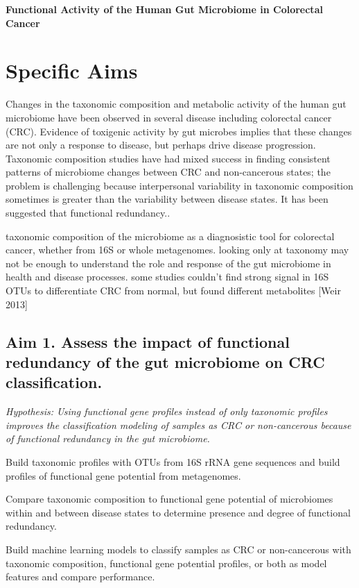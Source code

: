 \documentclass[12pt]{article}
\begin{document}
\sloppy
\begin{center}\large{\textbf{Functional Activity of the Human Gut Microbiome in Colorectal Cancer}}\end{center}
\section*{Specific Aims}

Changes in the taxonomic composition and metabolic activity of the human gut microbiome have been observed in several disease including colorectal cancer (CRC).
Evidence of toxigenic activity by gut microbes implies that these changes are not only a response to disease, but perhaps drive disease progression.
Taxonomic composition studies have had mixed success in finding consistent patterns of microbiome changes between CRC and non-cancerous states;
the problem is challenging because interpersonal variability in taxonomic composition sometimes is greater than the variability between disease states.
It has been suggested that functional redundancy..

taxonomic composition of the microbiome as a diagnosistic tool for colorectal cancer, whether from 16S or whole metagenomes.
looking only at taxonomy may not be enough to understand the role and response of the gut microbiome in health and disease processes.
some studies couldn't find strong signal in 16S OTUs to differentiate CRC from normal, but found different metabolites [Weir 2013]

\subsection*{Aim 1. Assess the impact of functional redundancy of the gut microbiome on CRC classification.}
\textit{Hypothesis: Using functional gene profiles instead of only taxonomic profiles improves the classification modeling of samples as CRC or non-cancerous because of functional redundancy in the gut microbiome.}
\begin{compactenum}[A.]
    \item Build taxonomic profiles with OTUs from 16S rRNA gene sequences and build profiles of functional gene potential from metagenomes.
    \item Compare taxonomic composition to functional gene potential of microbiomes within and between disease states to determine presence and degree of functional redundancy.
    \item Build machine learning models to classify samples as CRC or non-cancerous with taxonomic composition, functional gene potential profiles, or both as model features and compare performance.
\end{compactenum}
\end{document}

